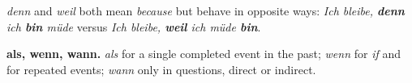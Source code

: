 \begin{gnote}
\textit{denn} and \textit{weil} both mean \emph{because} but behave in opposite
ways: \textit{Ich bleibe, \textbf{denn} ich \textbf{bin} müde} versus
\textit{Ich bleibe, \textbf{weil} ich müde \textbf{bin}}.
\end{gnote}

\begin{gnote}
\textbf{als, wenn, wann.} \textit{als} for a single completed event in the past;
\textit{wenn} for \emph{if} and for repeated events; \textit{wann} only in
questions, direct or indirect.
\end{gnote}
